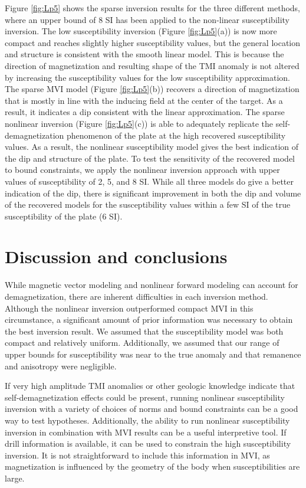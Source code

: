 \documentclass{segabs}
\begin{document}
Figure \ref{fig:Lp5} shows the sparse inversion results for the three different methods, where an upper bound of 8 SI has been applied to the non-linear susceptibility inversion. The low susceptibility inversion (Figure \ref{fig:Lp5}(a))  is now more compact and reaches slightly higher susceptibility values, but the general location and structure is consistent with the smooth linear model. This is because the direction of magnetization and resulting shape of the TMI anomaly is not altered by increasing the susceptibility values for the low susceptibility approximation. The sparse MVI model (Figure \ref{fig:Lp5}(b)) recovers a direction of magnetization that is mostly in line with the inducing field at the center of the target. As a result, it indicates a dip consistent with the linear approximation. The sparse nonlinear inversion (Figure \ref{fig:Lp5}(c))  is able to adequately replicate the self-demagnetization phenomenon of the plate at the high recovered susceptibility values. As a result, the nonlinear susceptibility model gives the best indication of the dip and structure of the plate. To test the sensitivity of the recovered model to bound constraints, we apply the nonlinear inversion approach with upper values of susceptibility of 2, 5, and 8 SI. While all three models do give a better indication of the dip, there is significant improvement in both the dip and volume of the recovered models for the susceptibility values within a few SI of the true susceptibility of the plate (6 SI).




\section{Discussion and conclusions}

While magnetic vector modeling and nonlinear forward modeling can account for demagnetization, there are inherent difficulties in each inversion method. Although the nonlinear inversion outperformed compact MVI in this circumstance, a significant amount of prior information was necessary to obtain the best inversion result.  We assumed that the susceptibility model was both compact and relatively uniform. Additionally, we assumed that our range of upper bounds for susceptibility was near to the true anomaly and that remanence and anisotropy were negligible.

If very high amplitude TMI anomalies or other geologic knowledge indicate that self-demagnetization effects could be present, running nonlinear susceptibility inversion with a variety of choices of norms and bound constraints can be a good way to test hypotheses. Additionally, the ability to run nonlinear susceptibility inversion in combination with MVI results can be a useful interpretive tool. If drill information is available, it can be used to constrain the high susceptibility inversion. It is not straightforward to include this information in MVI, as magnetization is influenced by the geometry of the body when susceptibilities are large.

\onecolumn



\end{document}
